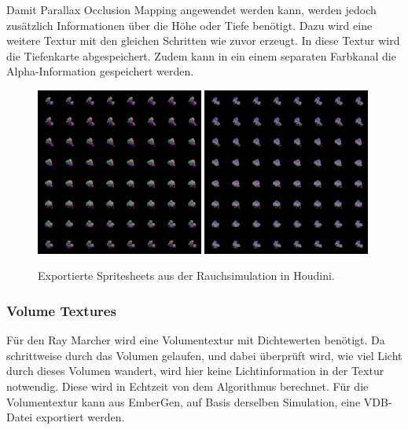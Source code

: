 Damit Parallax Occlusion Mapping angewendet werden kann, werden jedoch zusätzlich Informationen über die Höhe oder Tiefe benötigt.
Dazu wird eine weitere Textur mit den gleichen Schritten wie zuvor erzeugt. In diese Textur wird die Tiefenkarte abgespeichert. Zudem kann in ein einem separaten
Farbkanal die Alpha-Information gespeichert werden.


\begin{figure}[!hb]
	\centering
	\includegraphics[width=0.49\textwidth]{Grafiken/Implementation/Lightmaps/smokeSim_T1.png}
	\includegraphics[width=0.49\textwidth]{Grafiken/Implementation/Lightmaps/smokeSim_T2.png}
	\begin{footnotesize}
		\caption{Exportierte Spritesheets aus der Rauchsimulation in Houdini. }
		\label{fig:flipbook}
	\end{footnotesize}
\end{figure}


\subsubsection{Volume Textures}
Für den Ray Marcher wird eine Volumentextur mit Dichtewerten benötigt. Da schrittweise durch das Volumen gelaufen, und dabei überprüft wird, wie viel Licht
durch dieses Volumen wandert, wird hier keine Lichtinformation in der Textur notwendig. Diese wird in Echtzeit von dem Algorithmus berechnet.
Für die Volumentextur kann aus EmberGen, auf Basis derselben Simulation, eine VDB-Datei exportiert werden.

